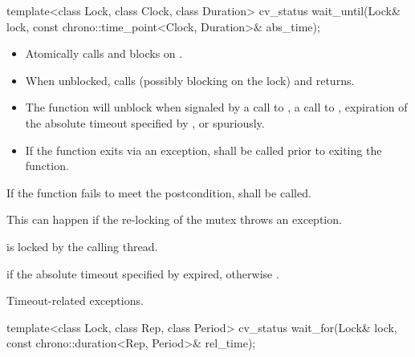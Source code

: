 %
\begin{itemdecl}
template<class Lock, class Clock, class Duration>
  cv_status wait_until(Lock& lock, const chrono::time_point<Clock, Duration>& abs_time);
\end{itemdecl}

\begin{itemdescr}
\pnum\effects

\begin{itemize}
\item
Atomically calls  and blocks on .

\item
When unblocked, calls  (possibly blocking on the lock) and returns.

\item
The function will unblock when signaled by a call to , a call to ,
expiration of the absolute timeout specified by ,
or spuriously.

\item
If the function exits via an exception,  shall be called prior to exiting the function.
\end{itemize}

\pnum
\remarks
If the function fails to meet the postcondition, 
shall be called.
\begin{note} This can happen if the re-locking of the mutex throws an exception. \end{note}

\pnum
\postconditions {} is locked by the calling thread.

\pnum
\returns {} if
the absolute timeout specified by  expired,
otherwise .

\pnum
\throws Timeout-related
exceptions.

\end{itemdescr}

%
\begin{itemdecl}
template<class Lock, class Rep, class Period>
  cv_status wait_for(Lock& lock, const chrono::duration<Rep, Period>& rel_time);
\end{itemdecl}

